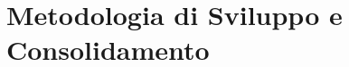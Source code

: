 \documentclass[11pt,a4paper,openany]{book}
\begin{document}
\clearpage

\tableofcontents
\clearpage

\mainmatter

\part{Metodologia di Sviluppo e Consolidamento}







% 
% 
% 

% 
% 
% 

% 
% 

\backmatter
\end{document}
